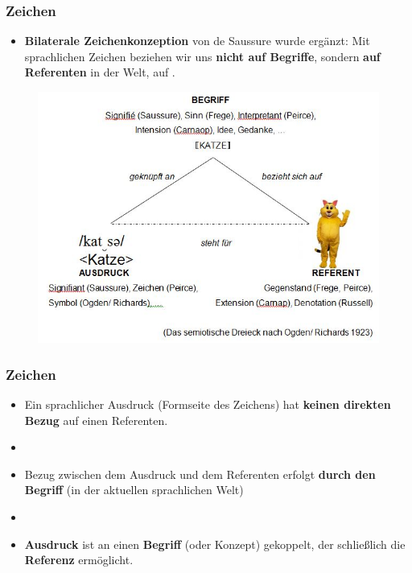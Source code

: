 \begin{frame} \frametitle{Zeichen}

\begin{itemize}
	\item \textbf{Bilaterale Zeichenkonzeption} von de Saussure wurde ergänzt: Mit sprachlichen Zeichen beziehen wir uns \textbf{nicht auf Begriffe}, sondern \textbf{auf Referenten} in der Welt, auf .
\end{itemize}

\begin{figure}
	\centering
	\includegraphics[scale=0.4]{material/07SemiotischesDreieck}
\end{figure}
	
\end{frame}	



\begin{frame}
\frametitle{Zeichen}

\begin{itemize}
	\item Ein sprachlicher Ausdruck (Formseite des Zeichens) hat \textbf{keinen direkten Bezug} auf einen Referenten.
	
	\item []	
	
	\item Bezug zwischen dem Ausdruck und dem Referenten erfolgt \textbf{durch den Begriff} (in der aktuellen sprachlichen Welt)
	
	\item[]
	
	\item \textbf{Ausdruck} ist an einen \textbf{Begriff} (oder Konzept) gekoppelt, der schließlich die \textbf{Referenz} ermöglicht.
		
\end{itemize}
	
\end{frame}


